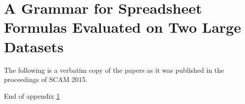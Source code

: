 \documentclass[11pt,a4paper,onecolumn,oneside,parskip]{memoir}
\newcommand{\emptypage}{%
\mbox{}%
\thispagestyle{empty}%
\newpage%
}
\begin{document}
%


\clearpage

\emptypage



\clearpage
{\small\tableofcontents*}

\clearpage





















\clearpage


\appendix



\chapter{A Grammar for Spreadsheet Formulas Evaluated on Two Large Datasets}
\label{appendix:xlparser}

The following is a verbatim copy of the papers as it was published in the proceedings of SCAM 2015.

\clearpage



\clearpage

\vspace*{\fill}

\centering
\large{End of appendix \ref{appendix:xlparser}}

\vspace*{\fill}
\end{document}
